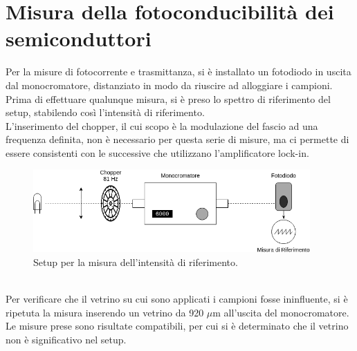 \documentclass[11pt]{article} %
\begin{document}
\section{Misura della fotoconducibilità dei semiconduttori}
Per la misure di fotocorrente e trasmittanza, si è installato un fotodiodo in uscita dal monocromatore,  distanziato in modo da riuscire ad alloggiare i campioni. Prima di effettuare qualunque misura, si è preso lo spettro di riferimento del setup, stabilendo così l'intensità di riferimento.\\
L'inserimento del chopper, il cui scopo è la modulazione del fascio ad una frequenza definita, non è necessario per questa serie di misure, ma ci permette di essere consistenti con le successive che utilizzano l'amplificatore lock-in.
\begin{figure}[h!]
\begin{center}
\includegraphics[width=400px]{img/foto_rif.png}
\caption{Setup per la misura dell'intensità di riferimento.}
\end{center}
\end{figure}
\\Per verificare che il vetrino su cui sono applicati i campioni fosse ininfluente, si è ripetuta la misura inserendo un vetrino da 920 $\mu$m all'uscita del monocromatore. Le misure prese sono risultate compatibili, per cui si è determinato che il vetrino non è significativo nel setup.
\end{document}
